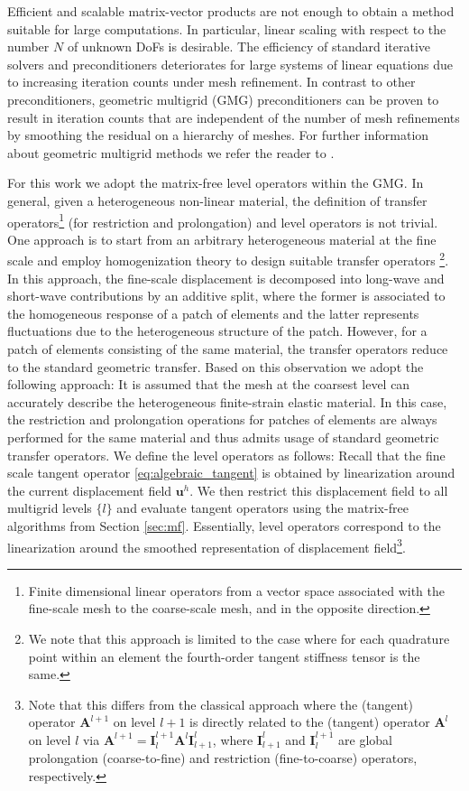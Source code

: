 \documentclass[times,doublespace]{nmeauth}
\def\gz  #1{           \mbox{$\boldsymbol{#1}$}}
\begin{document}
Efficient and scalable matrix-vector products are not enough to obtain a method suitable for large computations. In particular, linear scaling with respect to the number $N$ of unknown DoFs is desirable.
The efficiency of standard iterative solvers and preconditioners deteriorates for large systems of linear equations due to increasing iteration counts under mesh refinement.
In contrast to other preconditioners, geometric multigrid (GMG) preconditioners \cite{Bramble1990, Briggs2000, Janssen2011,May2015} can be proven to result in iteration counts that are independent of the number of mesh refinements by smoothing the residual on a hierarchy of meshes. For further information about geometric multigrid methods we refer the reader to \cite{Briggs2000,Hackbusch1985,Wesseling1992}.

For this work we adopt the matrix-free level operators within the GMG.
In general, given a heterogeneous non-linear material, the definition of transfer operators\footnote{Finite dimensional linear operators from a vector space associated with the fine-scale mesh to the coarse-scale mesh, and in the opposite direction.} (for restriction and prolongation) and level operators is not trivial. One approach is to start from an arbitrary heterogeneous material at the fine scale and employ homogenization theory \cite{Suquet1987, Hill1972,Hashin1983,Castaneda1997} to design suitable transfer operators \cite{Miehe2007}\footnote{
  We note that this approach is limited to the case where for each quadrature point within an element the fourth-order tangent stiffness tensor is the same.
}.
In this approach, the fine-scale displacement is decomposed into long-wave and short-wave contributions by an additive split, where the former is associated to the homogeneous response of a patch of elements and the latter represents fluctuations due to the heterogeneous structure of the patch.
However, for a patch of elements consisting of the same material, the transfer operators reduce to the standard geometric transfer.
Based on this observation we adopt the following approach: It is assumed that the mesh at the coarsest level can accurately describe the heterogeneous finite-strain elastic material.
In this case, the restriction and prolongation operations for patches of elements are always performed for the same material and thus admits usage of standard geometric transfer operators.
We define the level operators as follows: Recall that the fine scale tangent operator \eqref{eq:algebraic_tangent} is obtained by linearization around the current displacement field $\gz u^h$. We then restrict this displacement field to all multigrid levels $\{l\}$ and evaluate tangent operators using the matrix-free algorithms from Section \ref{sec:mf}.
Essentially, level operators correspond to the linearization around the smoothed representation of displacement field\footnote{
Note that this differs from the classical approach where the (tangent) operator $\gz A^{l+1}$ on level $l+1$ is directly related to the (tangent) operator $\gz A^{l}$ on level $l$ via $\gz A^{l+1}=\gz I^{l+1}_{l} \gz A^l \gz I^l_{l+1}$, where $\gz I^l_{l+1}$ and $\gz I^{l+1}_l$ are global prolongation (coarse-to-fine) and restriction (fine-to-coarse) operators, respectively.
}.
\end{document}
